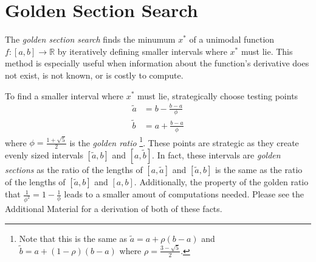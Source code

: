 \label{lab:1-dOpt}


\section*{Golden Section Search} %

The \emph{golden section search} finds the minumum $x^*$ of a unimodal function $f:[a,b]\rightarrow\mathbb{R}$ by iteratively defining smaller intervals where $x^*$ must lie.
This method is especially useful when information about the function's derivative does not exist, is not known, or is costly to compute.

To find a smaller interval where $x^*$ must lie, strategically choose testing points
\begin{align*}
\tilde{a} &= b - \frac{b - a}{\phi}\\
\tilde{b} &= a + \frac{b - a}{\phi}
\end{align*}
where $\phi = \frac{1 + \sqrt{5}}{2}$ is the \emph{golden ratio} \footnote{Note that this is the same as $\tilde{a} = a + \rho(b-a)$ and $\tilde{b} = a + (1-\rho)(b-a)$ where $\rho = \frac{3-\sqrt{5}}{2}$.}.
These points are strategic as they create evenly sized intervals $[\tilde{a}, b]$ and $[a, \tilde{b}]$.
In fact, these intervals are \emph{golden sections} as the ratio of the lengths of $[a,\tilde{a}]$ and $[\tilde{a},b]$ is the same as the ratio of the lengths of $[\tilde{a}, b]$ and $[a, b]$.
Additionally, the property of the golden ratio that  $\frac{1}{\phi^2} = 1 - \frac{1}{\phi}$ leads to a smaller amout of computations needed.
Please see the Additional Material for a derivation of both of these facts.

